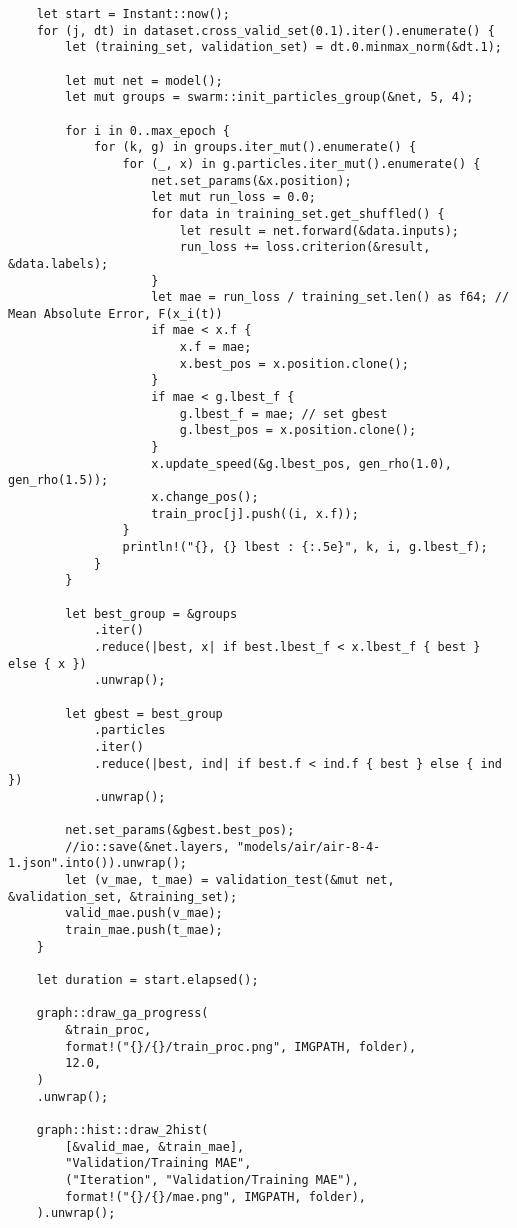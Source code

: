 \begin{code}
\begin{verbatim}
    let start = Instant::now();
    for (j, dt) in dataset.cross_valid_set(0.1).iter().enumerate() {
        let (training_set, validation_set) = dt.0.minmax_norm(&dt.1);

        let mut net = model();
        let mut groups = swarm::init_particles_group(&net, 5, 4);

        for i in 0..max_epoch {
            for (k, g) in groups.iter_mut().enumerate() {
                for (_, x) in g.particles.iter_mut().enumerate() {
                    net.set_params(&x.position);
                    let mut run_loss = 0.0;
                    for data in training_set.get_shuffled() {
                        let result = net.forward(&data.inputs);
                        run_loss += loss.criterion(&result, &data.labels);
                    }
                    let mae = run_loss / training_set.len() as f64; // Mean Absolute Error, F(x_i(t))
                    if mae < x.f {
                        x.f = mae;
                        x.best_pos = x.position.clone();
                    }
                    if mae < g.lbest_f {
                        g.lbest_f = mae; // set gbest
                        g.lbest_pos = x.position.clone();
                    }
                    x.update_speed(&g.lbest_pos, gen_rho(1.0), gen_rho(1.5));
                    x.change_pos();
                    train_proc[j].push((i, x.f));
                }
                println!("{}, {} lbest : {:.5e}", k, i, g.lbest_f);
            }
        }

        let best_group = &groups
            .iter()
            .reduce(|best, x| if best.lbest_f < x.lbest_f { best } else { x })
            .unwrap();

        let gbest = best_group
            .particles
            .iter()
            .reduce(|best, ind| if best.f < ind.f { best } else { ind })
            .unwrap();

        net.set_params(&gbest.best_pos);
        //io::save(&net.layers, "models/air/air-8-4-1.json".into()).unwrap();
        let (v_mae, t_mae) = validation_test(&mut net, &validation_set, &training_set);   
        valid_mae.push(v_mae);
        train_mae.push(t_mae);
    }

    let duration = start.elapsed();
    
    graph::draw_ga_progress(
        &train_proc,
        format!("{}/{}/train_proc.png", IMGPATH, folder),
        12.0,
    )
    .unwrap();

    graph::hist::draw_2hist(
        [&valid_mae, &train_mae],
        "Validation/Training MAE",
        ("Iteration", "Validation/Training MAE"),
        format!("{}/{}/mae.png", IMGPATH, folder),
    ).unwrap();


\end{verbatim}
\end{code}
